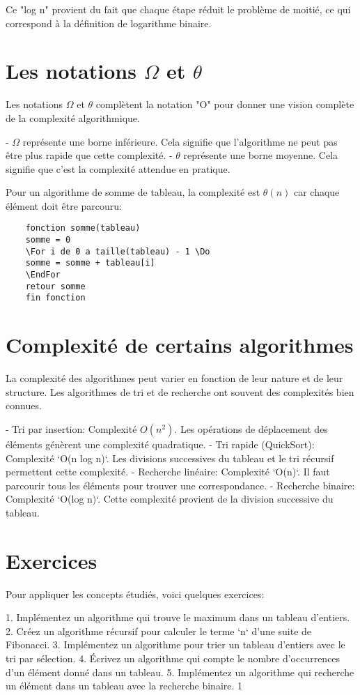 Ce "log n" provient du fait que chaque étape réduit le problème de moitié, ce qui correspond à la définition de logarithme binaire.

\section{Les notations $\Omega$ et $\theta$}
Les notations $\Omega$ et $\theta$ complètent la notation "O" pour donner une vision complète de la complexité algorithmique.

- $\Omega$ représente une borne inférieure. Cela signifie que l'algorithme ne peut pas être plus rapide que cette complexité.
- $\theta$ représente une borne moyenne. Cela signifie que c'est la complexité attendue en pratique.

Pour un algorithme de somme de tableau, la complexité est $\theta(n)$ car chaque élément doit être parcouru:

\begin{lstlisting}
	fonction somme(tableau)
	somme = 0
	\For i de 0 a taille(tableau) - 1 \Do
	somme = somme + tableau[i]
	\EndFor
	retour somme
	fin fonction
\end{lstlisting}

\section{Complexité de certains algorithmes}
La complexité des algorithmes peut varier en fonction de leur nature et de leur structure. Les algorithmes de tri et de recherche ont souvent des complexités bien connues.

- Tri par insertion: Complexité $O(n^2)$. Les opérations de déplacement des éléments génèrent une complexité quadratique.
- Tri rapide (QuickSort): Complexité `O(n log n)`. Les divisions successives du tableau et le tri récursif permettent cette complexité.
- Recherche linéaire: Complexité `O(n)`. Il faut parcourir tous les éléments pour trouver une correspondance.
- Recherche binaire: Complexité `O(log n)`. Cette complexité provient de la division successive du tableau.

\section{Exercices}
Pour appliquer les concepts étudiés, voici quelques exercices:

1. Implémentez un algorithme qui trouve le maximum dans un tableau d'entiers.
2. Créez un algorithme récursif pour calculer le terme `n` d'une suite de Fibonacci.
3. Implémentez un algorithme pour trier un tableau d'entiers avec le tri par sélection.
4. Écrivez un algorithme qui compte le nombre d'occurrences d'un élément donné dans un tableau.
5. Implémentez un algorithme qui recherche un élément dans un tableau avec la recherche binaire.
1


